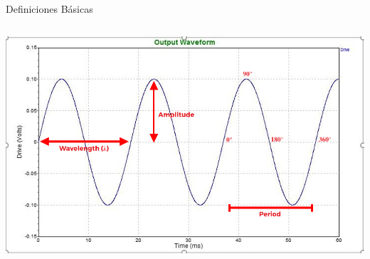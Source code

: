\documentclass[
    10pt,
    aspectratio=169,
    xcolor={dvipsnames},
    spanish,
    ]{beamer}
\begin{document}
\begin{frame}{Definiciones Básicas}
\begin{columns}[T,totalwidth=\textwidth]
\begin{column}{0.42\textwidth}
        \includegraphics[width=\textwidth]{Auxiliar_1_5.png}
      \end{column}
    \end{columns}
\end{frame}
\end{document}
